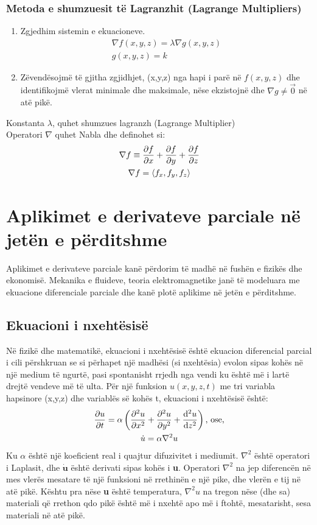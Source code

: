 \documentclass[a4paper]{article}
\begin{document}
\subsubsection{Metoda e shumzuesit të Lagranzhit (Lagrange Multipliers)}
\begin{enumerate}
	\item Zgjedhim sistemin e ekuacioneve.
	      \begin{gather*}
		      \nabla f(x,y,z)=\lambda \nabla g(x,y,z)\\
		      g(x,y,z) = k
	      \end{gather*}
	\item Zëvendësojmë të gjitha zgjidhjet, (x,y,z) nga hapi i parë në $f(x,y,z)$ dhe identifikojmë vlerat minimale dhe maksimale, nëse ekzistojnë dhe $\nabla g \neq \vec{0}$ në atë pikë.
\end{enumerate}
Konstanta $\lambda$, quhet shumzues lagranzh (Lagrange Multiplier)\\
Operatori $\nabla$ quhet Nabla dhe definohet si:
\begin{gather*}
	\nabla f\equiv \pdv{f}{x} + \pdv{f}{y} + \pdv{f}{z}\\
	\nabla f = \left\langle f_x,f_y,f_z \right\rangle
\end{gather*}
\section{Aplikimet e derivateve parciale në jetën e përditshme}
Aplikimet e derivateve parciale kanë përdorim të madhë në fushën e fizikës dhe ekonomisë. Mekanika e fluideve, teoria elektromagnetike janë të modeluara me ekuacione diferenciale parciale dhe kanë plotë aplikime në jetën e përditshme.
\subsection{Ekuacioni i nxehtësisë}
Në fizikë dhe matematikë, ekuacioni i nxehtësisë është ekuacion diferencial parcial i cili përshkruan se si përhapet një madhësi (si nxehtësia) evolon sipas kohës në një medium të ngurtë, pasi spontanisht rrjedh nga vendi ku është më i lartë drejtë vendeve më të ulta. Për një funksion $u(x,y,z,t)$ me tri variabla hapsinore (x,y,z) dhe variablës së kohës t, ekuacioni i nxehtësisë është:
\begin{gather*}
	\pdv{u}{t} = \alpha\left( \pdv[2]{u}{x}+\pdv[2]{u}{y}+\dv[2]{u}{z} \right)\text{, ose,}\\
	\dot{u}=\alpha\nabla^2 u
\end{gather*}
Ku $\alpha$ është një koeficient real i quajtur difuzivitet i mediumit.
\textbf{$\nabla^2$} është operatori i Laplasit, dhe \textbf{$\dot{\textbf{u}}$} është derivati sipas kohës i \textbf{u}.
Operatori \textbf{$\nabla^2$} na jep diferencën në mes vlerës mesatare të një funksioni në rrethinën e një pike, dhe vlerën e tij në atë pikë. Kështu pra nëse \textbf{u} është temperatura, \textbf{$\nabla^2u$} na tregon nëse (dhe sa) materiali që rrethon qdo pikë është më i nxehtë apo më i ftohtë,  mesatarisht, sesa materiali në atë pikë.
\end{document}
